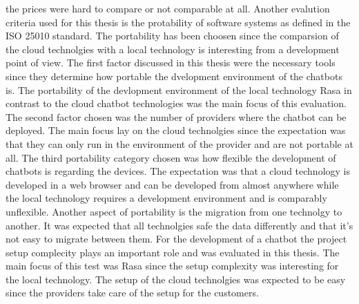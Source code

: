 the prices were hard to compare or not comparable at all.
Another evalution criteria used for this thesis is the protability of 
software systems as defined in the ISO 25010\cite{iso25010} standard.
The portability has been choosen since the comparsion of the cloud 
technolgies with a local technology is interesting from a 
development point of view.
The first factor discussed in this thesis were the necessary tools 
since they determine how portable the dvelopment environment of the 
chatbots is.
The portability of the devlopment environment of the local technology 
Rasa in contrast to the cloud chatbot technologies was the 
main focus of this evaluation.
The second factor chosen was the number of providers where the 
chatbot can be deployed.
The main focus lay on the cloud technolgies since the expectation was
that they can only run in the environment of the provider and are 
not portable at all.
The third portability category chosen was how flexible the development
of chatbots is regarding the devices.
The expectation was that a cloud technology is developed in a 
web browser and can be developed from almost anywhere while 
the local technology requires a development environment and is 
comparably unflexible.
Another aspect of portability is the migration from one technolgy to another.
It was expected that all technolgies safe the data differently and that it's not 
easy to migrate between them.
For the development of a chatbot the project setup complecity plays an important 
role and was evaluated in this thesis.
The main focus of this test was Rasa since the setup complexity was interesting 
for the local technology.
The setup of the cloud technolgies was expected to be easy since the providers 
take care of the setup for the customers.







